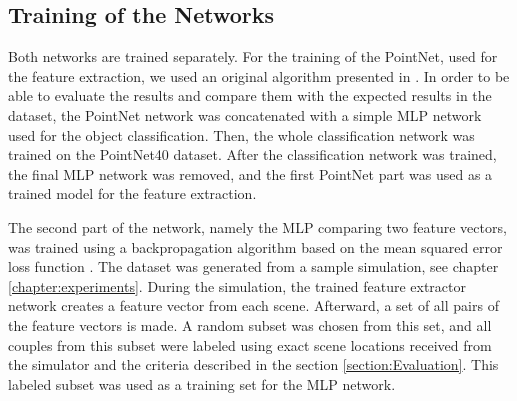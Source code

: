 \subsection{Training of the Networks}\label{section:nnTraining}

Both networks are trained separately. For the training of the PointNet, used for the feature extraction, we used an original algorithm presented in \cite{PointNet}. In order to be able to evaluate the results and compare them with the expected results in the dataset, the PointNet network was concatenated with a simple MLP network used for the object classification. Then, the whole classification network was trained on the PointNet40 \cite{PointNet40} dataset. After the classification network was trained, the final MLP network was removed, and the first PointNet part was used as a trained model for the feature extraction.\par
The second part of the network, namely the MLP comparing two feature vectors, was trained using a backpropagation algorithm \cite{backPropagation} based on the mean squared error loss function \cite{MSELoss}. The dataset was generated from a sample simulation, see chapter \ref{chapter:experiments}. During the simulation, the trained feature extractor network creates a feature vector from each scene. Afterward, a set of all pairs of the feature vectors is made. A random subset was chosen from this set, and all couples from this subset were labeled using exact scene locations received from the simulator and the criteria described in the section \ref{section:Evaluation}. This labeled subset was used as a training set for the MLP network.
